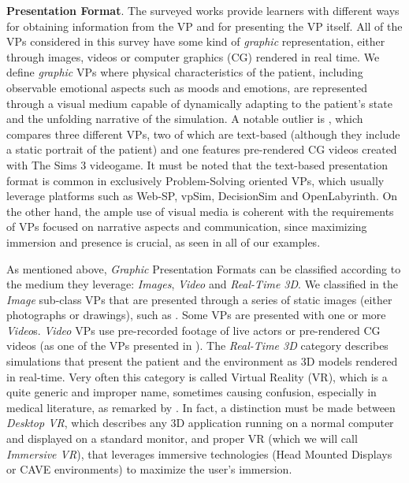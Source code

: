 \textbf{Presentation Format}. The surveyed works provide learners with different ways for obtaining information from the VP and for presenting the VP itself.
All of the VPs considered in this survey have some kind of \emph{graphic} representation, either through images, videos or computer graphics (CG) rendered in real time. We define \emph{graphic} VPs where physical characteristics of the patient, including observable emotional aspects such as moods and emotions, are represented through a visual medium capable of dynamically adapting to the patient's state and the unfolding narrative of the simulation. 
A notable outlier is \cite{foster2016using}, which compares three different VPs, two of which are text-based (although they include a static portrait of the patient) and one features pre-rendered CG videos created with The Sims 3 videogame.
It must be noted that the text-based presentation format is common in exclusively Problem-Solving oriented VPs, which usually leverage platforms such as Web-SP, vpSim, DecisionSim and OpenLabyrinth. %
On the other hand, the ample use of visual media is coherent with the requirements of VPs focused on narrative aspects and communication, since maximizing immersion and presence is crucial, as seen in all of our examples.\par
As mentioned above, \emph{Graphic} Presentation Formats can be classified according to the medium they leverage: \emph{Images}, \emph{Video} and  \emph{Real-Time 3D}.
We classified in the \emph{Image} sub-class VPs that are presented through a series of static images (either photographs or drawings), such as \cite{adefila2020students,marei2018use,albright2018using}.
Some VPs are presented with one or more \emph{Video}s. \emph{Video} VPs use pre-recorded footage of live actors \cite{o2019suicide,peddle2019exploring} or pre-rendered CG videos (as one of the VPs presented in \cite{foster2016using}).
The \emph{Real-Time 3D} category describes simulations that present the patient and the environment as 3D models rendered in real-time. Very often this category is called Virtual Reality (VR), which is a quite generic and improper name, sometimes causing confusion, especially in medical literature, as remarked by \cite{foronda2020virtual}. In fact, a distinction must be made between \emph{Desktop VR}, which describes any 3D application running on a normal computer and displayed on a standard monitor, and proper VR (which we will call \emph{Immersive VR}), that leverages immersive technologies (Head Mounted Displays or CAVE environments) to maximize the user's immersion. 

